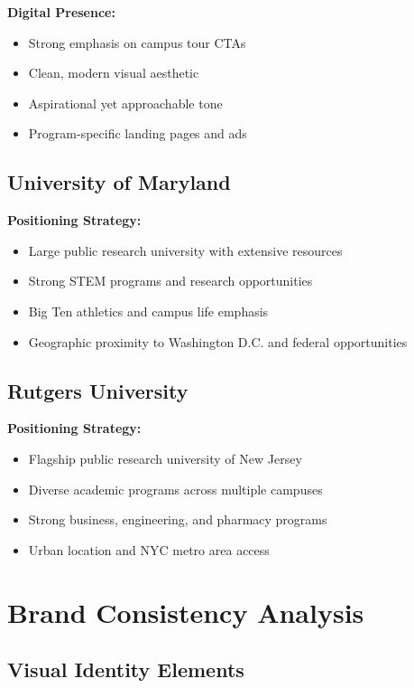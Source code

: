 \documentclass[12pt,letterpaper]{article}
\begin{document}
\textbf{Digital Presence:}
\begin{itemize}[leftmargin=*]
    \item Strong emphasis on campus tour CTAs
    \item Clean, modern visual aesthetic
    \item Aspirational yet approachable tone
    \item Program-specific landing pages and ads
\end{itemize}

\subsection{University of Maryland}

\textbf{Positioning Strategy:}
\begin{itemize}[leftmargin=*]
    \item Large public research university with extensive resources
    \item Strong STEM programs and research opportunities
    \item Big Ten athletics and campus life emphasis
    \item Geographic proximity to Washington D.C. and federal opportunities
\end{itemize}

\subsection{Rutgers University}

\textbf{Positioning Strategy:}
\begin{itemize}[leftmargin=*]
    \item Flagship public research university of New Jersey
    \item Diverse academic programs across multiple campuses
    \item Strong business, engineering, and pharmacy programs
    \item Urban location and NYC metro area access
\end{itemize}

\section{Brand Consistency Analysis}

\subsection{Visual Identity Elements}
\end{document}
